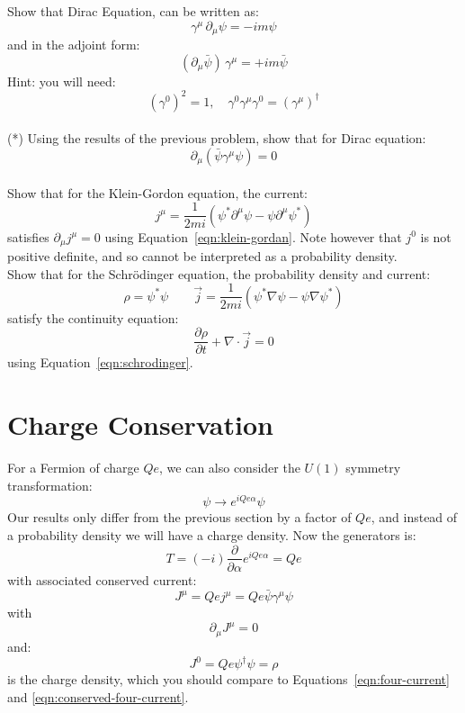 \documentclass[12pt]{article}
\begin{document}
\exercise Show that Dirac Equation, can be written as:
$$\gamma^\mu \, \partial_\mu \psi = - i m \psi$$
and in the adjoint form:
$$\left( \partial_\mu \bar{\psi} \right) \, \gamma^\mu = + i m \bar{\psi}$$
Hint: you will need:
$$(\gamma^0)^2=1, \quad \gamma^0 \gamma^\mu \gamma^0 = \left( \gamma^\mu \right)^\dagger$$
~\\[-3pt]

\exercise (*) Using the results of the previous problem, show that for Dirac equation:
$$\partial_\mu (\bar{\psi} \gamma^\mu \psi) = 0$$
~\\[-3pt]

\exercise Show that for the Klein-Gordon equation, the current:
\begin{equation*}
j^\mu = \frac{1}{2mi}\left(\psi^*\partial^\mu\psi - \psi\partial^\mu\psi^*\right)
\end{equation*}
satisfies $\partial_\mu j^\mu = 0$ using
Equation~\ref{eqn:klein-gordan}. Note however that $j^0$ is not
positive definite, and so cannot be interpreted as a probability
density.\\[5pt]

\exercise Show that for the Schr\"odinger equation, the probability density and current:
\begin{equation*}
\rho = \psi^*\psi \qquad \vec{j} = \frac{1}{2mi}\left(\psi^*\nabla\psi - \psi\nabla\psi^*\right)
\end{equation*}
satisfy the continuity equation:
\begin{equation*}
\frac{\partial\rho}{\partial t} + \nabla\cdot\vec{j} = 0
\end{equation*}
using Equation~\ref{eqn:schrodinger}.
~\\[-3pt]

\section{Charge Conservation}

For a Fermion of charge $Qe$, we can also consider the $U(1)$ symmetry
transformation:
$$\psi \to e^{i Qe \alpha} \psi$$
Our results only differ from the previous section by a factor of $Qe$,
and instead of a probability density we will have a charge density.
Now the generators is:
$$T = (-i) \frac{\partial}{\partial \alpha} e^{iQe\alpha} = Qe$$
with associated conserved current:
\begin{equation}
J^\mu = Q e j^\mu = Q e \bar{\psi} \gamma^\mu \psi
\end{equation}  
with
$$\partial_\mu J^\mu = 0$$
and:
$$J^0 = Q e \psi^\dagger \psi = \rho$$
is the charge density, which you should compare to
Equations~\ref{eqn:four-current} and \ref{eqn:conserved-four-current}.
\end{document}
